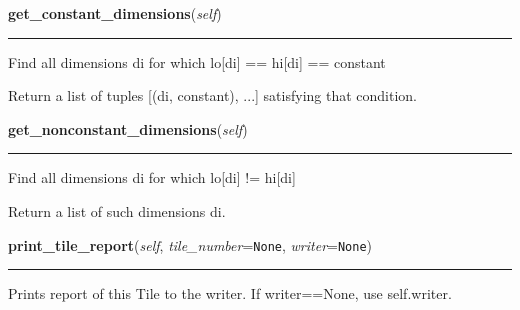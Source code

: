    \label{Tiling:Tile:get_constant_dimensions}

    \vspace{0.5ex}

\hspace{.8\funcindent}\begin{boxedminipage}{\funcwidth}

    \raggedright \textbf{get\_constant\_dimensions}(\textit{self})

    \vspace{-1.5ex}

    \rule{\textwidth}{0.5\fboxrule}
\setlength{\parskip}{2ex}
    Find all dimensions di for which lo[di] == hi[di] == constant

    Return a list of tuples [(di, constant), ...] satisfying that 
    condition.

\setlength{\parskip}{1ex}
    \end{boxedminipage}

    \label{Tiling:Tile:get_nonconstant_dimensions}

    \vspace{0.5ex}

\hspace{.8\funcindent}\begin{boxedminipage}{\funcwidth}

    \raggedright \textbf{get\_nonconstant\_dimensions}(\textit{self})

    \vspace{-1.5ex}

    \rule{\textwidth}{0.5\fboxrule}
\setlength{\parskip}{2ex}
    Find all dimensions di for which lo[di] != hi[di]

    Return a list of such dimensions di.

\setlength{\parskip}{1ex}
    \end{boxedminipage}

    \label{Tiling:Tile:print_tile_report}

    \vspace{0.5ex}

\hspace{.8\funcindent}\begin{boxedminipage}{\funcwidth}

    \raggedright \textbf{print\_tile\_report}(\textit{self}, \textit{tile\_number}={\tt None}, \textit{writer}={\tt None})

    \vspace{-1.5ex}

    \rule{\textwidth}{0.5\fboxrule}
\setlength{\parskip}{2ex}
    Prints report of this Tile to the writer. If writer==None, use 
    self.writer.

\setlength{\parskip}{1ex}
    \end{boxedminipage}

